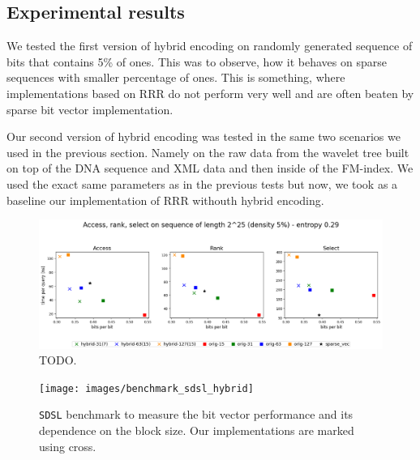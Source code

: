 \subsection{Experimental results}


We tested the first version of hybrid encoding on randomly generated sequence of bits that contains 5\% of ones.
This was to observe, how it behaves on sparse sequences with smaller percentage of ones. This is something, where
implementations based on RRR do not perform very well and are often beaten by sparse bit vector implementation.

Our second version of hybrid encoding was tested in the same two scenarios we used in the previous section. Namely
on the raw data from the wavelet tree built on top of the DNA sequence and XML data and then inside of the FM-index.
We used the exact same parameters as in the previous tests but now, we took as a baseline our implementation of RRR
withouth hybrid encoding. 

\begin{figure}
	\centerline{
		\includegraphics[width=\textwidth, height=0.27\textheight]{images/vysledky_hybrid_artif}
	}
	\caption[TODO]{TODO.
	}
	\label{obr:vysledky_hybrid_artif}
\end{figure}

\begin{figure}
	\centerline{
		\texttt{[image: images/benchmark\_sdsl\_hybrid]}
	}
	\caption[TODO]{\texttt{SDSL} benchmark to measure the bit vector performance and its dependence
	on the block size. Our implementations are marked using cross.
	}
	\label{obr:benchmark_sdsl_hybrid}
\end{figure}

